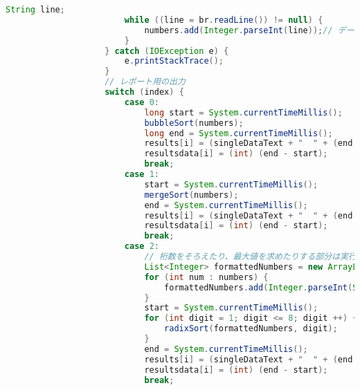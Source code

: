 \documentclass{jsarticle}
\begin{document}
\begin{lstlisting}[label=code:in, language=java]
                        String line;
                        while ((line = br.readLine()) != null) {
                            numbers.add(Integer.parseInt(line));// データのリストを作る
                        }
                    } catch (IOException e) {
                        e.printStackTrace();
                    }
                    // レポート用の出力
                    switch (index) {
                        case 0:
                            long start = System.currentTimeMillis();
                            bubbleSort(numbers);
                            long end = System.currentTimeMillis();
                            results[i] = (singleDataText + "  " + (end - start) + "ms");
                            resultsdata[i] = (int) (end - start);
                            break;
                        case 1:
                            start = System.currentTimeMillis();
                            mergeSort(numbers);
                            end = System.currentTimeMillis();
                            results[i] = (singleDataText + "  " + (end - start) + "ms");
                            resultsdata[i] = (int) (end - start);
                            break;
                        case 2:
                            // 桁数をそろえたり、最大値を求めたりする部分は実行時間時間に含めない
                            List<Integer> formattedNumbers = new ArrayList<>();// 桁数を揃えた数字を格納
                            for (int num : numbers) {
                                formattedNumbers.add(Integer.parseInt(String.format("%08d", num)));
                            }
                            start = System.currentTimeMillis();
                            for (int digit = 1; digit <= 8; digit ++) {// exp:桁数
                                radixSort(formattedNumbers, digit);
                            }
                            end = System.currentTimeMillis();
                            results[i] = (singleDataText + "  " + (end - start) + "ms");
                            resultsdata[i] = (int) (end - start);
                            break;
    

\end{lstlisting}
\end{document}
